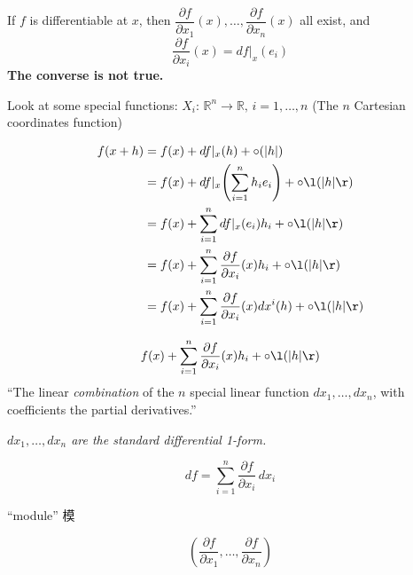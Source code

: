 \begin{theorem}
    If $f$ is differentiable at $x$, then $\dfrac{\partial f}{\partial x_1}(x),\dots,\dfrac{\partial f}{\partial x_n}(x)$ all exist, and
    $$
        \dfrac{\partial f}{\partial x_i}(x)=df|_x(e_i)
    $$
    \textbf{The converse is not true.}
\end{theorem}

Look at some special functions: $\boxed{X_i:\,\mathbb{R}^n\to\mathbb{R},\,i=1,\dots,n}$ (The $n$ Cartesian coordinates function)



\begin{align*}
    f(x+h) & =f(x)+df|_x(h)+\circ(|h|)                                                                \\
           & =f(x)+df|_x\!\left(\sum_{i=1}^{n}h_ie_i\right)+\circ\l(\lvert h\rvert\r)                 \\
           & =f(x)+\sum_{i=1}^{n}df|_x(e_i)h_i+\circ\l(\lvert h\rvert\r)                              \\
           & =f(x)+\sum_{i=1}^{n}\dfrac{\partial f}{\partial x_i}(x)h_i+\circ\l(\lvert h\rvert\r)     \\
           & =f(x)+\sum_{i=1}^{n}\dfrac{\partial f}{\partial x_i}(x)dx^i(h)+\circ\l(\lvert h\rvert\r)
\end{align*}

$$
    f(x)+\sum_{i=1}^{n}\dfrac{\partial f}{\partial x_i}(x)h_i+\circ\l(\lvert h\rvert\r)
$$
 ``The linear \emph{combination} of the $n$ special linear function $dx_1,\dots,dx_n$, with coefficients the partial derivatives.''

\emph{$dx_1,\dots,dx_n$ are the standard differential 1-form.}


$$df=\sum_{i=1}^{n}\dfrac{\partial f}{\partial x_i}\,dx_i$$

``module'' 模

$$\left(\dfrac{\partial f}{\partial x_1},\dots,\dfrac{\partial f}{\partial x_n}\right)$$

